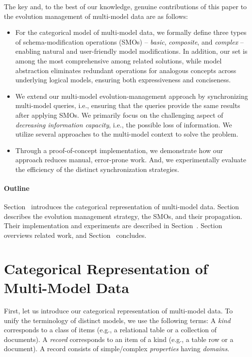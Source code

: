 The key and, to the best of our knowledge, genuine contributions of this paper to the evolution management of multi-model data are as follows:
\begin{itemize} 
    \item For the categorical model of multi-model data, we formally define three types of schema-modification operations (SMOs) -- \textit{basic}, \textit{composite}, and \textit{complex} -- enabling natural and user-friendly model modifications. In addition, our set is among the most comprehensive among related solutions, while model abstraction eliminates redundant operations for analogous concepts across underlying logical models, ensuring both expressiveness and conciseness.
    \item We extend our multi-model evolution-management approach by synchronizing multi-model queries, i.e., ensuring that the queries provide the same results after applying SMOs. We primarily focus on the challenging aspect of \textit{decreasing information capacity}, i.e., the possible loss of information. We utilize several approaches to the multi-model context to solve the problem.
    \item Through a proof-of-concept implementation, we demonstrate how our approach reduces manual, error-prone work. And, we experimentally evaluate the efficiency of the distinct synchronization strategies.  
\end{itemize}

\paragraph{Outline} Section~ introduces the categorical representation of multi-model data. Section~ describes the evolution management strategy, the SMOs, and their propagation. Their implementation and experiments are described in Section~. 
Section~ overviews related work, and Section~ concludes.

\section{Categorical Representation of Multi-Model Data}
First, let us introduce our categorical representation of multi-model data. To unify the terminology of distinct models, we use the following terms: A \textit{kind} corresponds to a class of items (e.g., a relational table or a collection of documents). A \textit{record} corresponds to an item of a kind (e.g., a table row or a document). A record consists of simple/complex \textit{properties} having \textit{domains}.

